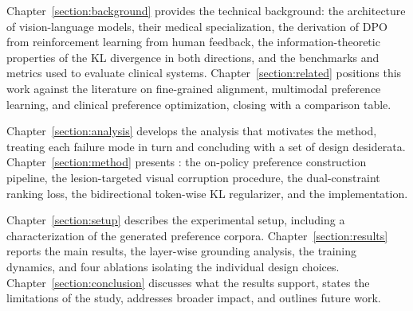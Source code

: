 Chapter~\ref{section:background} provides the technical background: the architecture of vision-language models, their medical specialization, the derivation of DPO from reinforcement learning from human feedback, the information-theoretic properties of the KL divergence in both directions, and the benchmarks and metrics used to evaluate clinical systems. Chapter~\ref{section:related} positions this work against the literature on fine-grained alignment, multimodal preference learning, and clinical preference optimization, closing with a comparison table.

Chapter~\ref{section:analysis} develops the analysis that motivates the method, treating each failure mode in turn and concluding with a set of design desiderata. Chapter~\ref{section:method} presents \ourloss{}: the on-policy preference construction pipeline, the lesion-targeted visual corruption procedure, the dual-constraint ranking loss, the bidirectional token-wise KL regularizer, and the implementation.

Chapter~\ref{section:setup} describes the experimental setup, including a characterization of the generated preference corpora. Chapter~\ref{section:results} reports the main results, the layer-wise grounding analysis, the training dynamics, and four ablations isolating the individual design choices. Chapter~\ref{section:conclusion} discusses what the results support, states the limitations of the study, addresses broader impact, and outlines future work.
